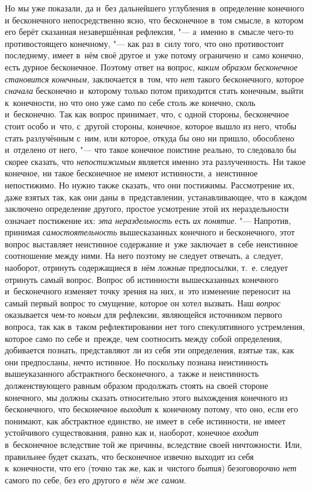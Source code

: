 Но мы уже
показали, да и~без дальнейшего углубления в~определение конечного и
бесконечного непосредственно ясно, что бесконечное в~том смысле, в~котором
его берёт сказанная незавершённая рефлексия, "--- а~именно в~смысле чего-то
противостоящего конечному, "--- как раз в~силу того, что оно противостоит
последнему, имеет в~нём своё другое и~уже потому ограничено и~само конечно,
есть дурное бесконечное. Поэтому ответ на вопрос,
{\em каким образом бесконечное становится конечным,}
заключается в~том, что {\em нет} такого бесконечного,
которое {\em сначала} бесконечно и~которому только
потом приходится стать конечным, выйти к~конечности, но что оно уже само по
себе столь же конечно, сколь и~бесконечно. Так как вопрос принимает, что, с
одной стороны, бесконечное стоит особо и~что, с~другой стороны, конечное,
которое вышло из него, чтобы стать разлучённым с~ним, или которое, откуда
бы оно ни пришло, обособлено и~отделено от него, "--- что такое конечное
поистине реально, то следовало бы скорее сказать, что
{\em непостижимым} является именно эта разлученность.
Ни такое конечное, ни такое бесконечное не имеют истинности, а~неистинное
непостижимо. Но нужно также сказать, что они
постижимы. Рассмотрение их, даже взятых так, как
они даны в~представлении, устанавливающее, что в~каждом заключено
определение другого, простое усмотрение этой их нераздельности означает
постижение их: {\em эта нераздельность} есть
{\em их понятие}. "--- Напротив, принимая
{\em самостоятельность} вышесказанных конечного и
бесконечного, этот вопрос выставляет неистинное содержание и~уже заключает
в~себе неистинное соотношение между ними. На него поэтому не следует
отвечать, а~следует, наоборот, отринуть содержащиеся в~нём ложные
предпосылки, т.~е. следует отринуть самый вопрос. Вопрос об истинности
вышесказанных конечного и~бесконечного изменяет точку зрения на них, и~это
изменение переносит на самый первый вопрос то смущение, которое он хотел
вызвать. Наш {\em вопрос} оказывается чем-то
{\em новым} для рефлексии, являющейся источником
первого вопроса, так как в~таком рефлектировании нет того спекулятивного
устремления, которое само по себе и~прежде, чем соотносить между собой
определения, добивается познать, представляют ли из себя эти определения,
взятые так, как они предпосланы, нечто истинное. Но поскольку познана
неистинность вышеуказанного абстрактного бесконечного, а~также и
неистинность долженствующего равным образом продолжать стоять на своей
стороне конечного, мы должны сказать относительно этого выхождения
конечного из бесконечного, что бесконечное
{\em выходит} к~конечному потому, что оно, если его
понимают, как абстрактное единство, не имеет в~себе истинности, не имеет
устойчивого существования, равно как и, наоборот, конечное
{\em входит} в~бесконечное вследствие той же причины,
вследствие своей ничтожности. Или, правильнее будет сказать, что
бесконечное извечно выходит из себя к~конечности, что его (точно так же,
как и~чистого {\em бытия}) безоговорочно
{\em нет} самого по себе, без его другого {\em в~нём же самом}.

